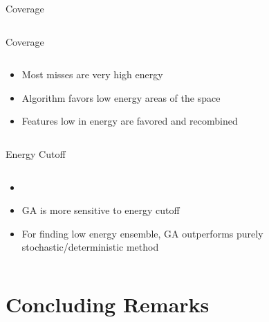 \documentclass[10pt]{beamer}
\begin{document}
{{{\begin{frame}{Coverage}
\begin{columns}[c]
\begin{column}{0.6\textwidth}
		\end{column}	
	\end{columns}
\end{frame}
}

{%
\begin{frame}{Coverage}
	\begin{columns}[c] %
		\begin{column}{.4\textwidth}
			\begin{itemize}[<+->]
				\item {Most misses are very high energy}
				\item {Algorithm favors low energy areas of the space}
				\item {Features low in energy are favored and recombined}
			\end{itemize}		
		\end{column}
		\hfill
		\begin{column}{0.6\textwidth}

		\end{column}	
	\end{columns}
\end{frame}
}

{%
\begin{frame}{Energy Cutoff}
	\begin{columns}[c] %
		\begin{column}{.4\textwidth}
			\begin{itemize}[<+->]
				\item[] {

				}
				\item {GA is more sensitive to energy cutoff}
				\item {For finding low energy ensemble, GA outperforms purely stochastic/deterministic method}
			\end{itemize}		
		\end{column}
		\hfill
		\begin{column}{0.6\textwidth}

		\end{column}	
	\end{columns}
\end{frame}
}

\section{Concluding Remarks}

}}
\end{document}
